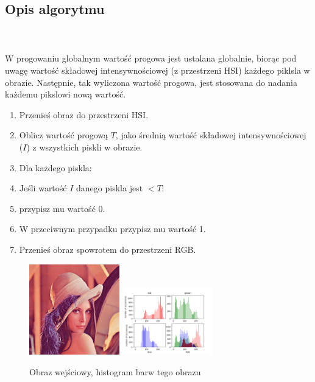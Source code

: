 \documentclass[final,a4paper,openany,12pt]{mwbk}
\begin{document}
\subsection*{Opis algorytmu}
\hfill
\\\\
\indent W progowaniu globalnym wartość progowa jest ustalana globalnie, biorąc pod uwagę wartość składowej intensywnościowej (z przestrzeni HSI) każdego piklsla w obrazie. Następnie, tak wyliczona wartość progowa, jest stosowana do nadania każdemu pikslowi nową wartość.
\begin{enumerate}
	\item Przenieś obraz do przestrzeni HSI.
	\item Oblicz wartość progową $T$, jako średnią wartość składowej intensywnościowej ($I$) z wszystkich piskli w obrazie.
	\item Dla każdego piskla:
	\item Jeśli wartość $I$ danego piskla jest $< T$:
	\item przypisz mu wartość $0$.
	\item W przeciwnym przypadku przypisz mu wartość 1.
	\item Przenieś obraz spowrotem do przestrzeni RGB.
\end{enumerate}

\begin{figure}[H]
	\begin{center}
		\includegraphics[width=0.35\textwidth]{lena_color}
		\includegraphics[width=0.35\textwidth]{lena_color_histogram}
	\end{center}
	\caption{Obraz wejściowy, histogram barw tego obrazu}
\end{figure}
\end{document}
